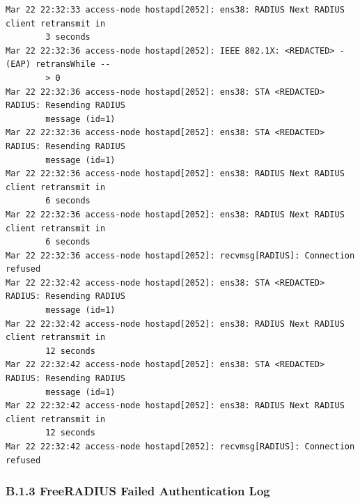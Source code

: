 \documentclass[11pt]{article}
\begin{document}
\begin{verbatim}
Mar 22 22:32:33 access-node hostapd[2052]: ens38: RADIUS Next RADIUS client retransmit in 
        3 seconds
Mar 22 22:32:36 access-node hostapd[2052]: IEEE 802.1X: <REDACTED> - (EAP) retransWhile --
        > 0
Mar 22 22:32:36 access-node hostapd[2052]: ens38: STA <REDACTED> RADIUS: Resending RADIUS 
        message (id=1)
Mar 22 22:32:36 access-node hostapd[2052]: ens38: STA <REDACTED> RADIUS: Resending RADIUS 
        message (id=1)
Mar 22 22:32:36 access-node hostapd[2052]: ens38: RADIUS Next RADIUS client retransmit in 
        6 seconds
Mar 22 22:32:36 access-node hostapd[2052]: ens38: RADIUS Next RADIUS client retransmit in 
        6 seconds
Mar 22 22:32:36 access-node hostapd[2052]: recvmsg[RADIUS]: Connection refused
Mar 22 22:32:42 access-node hostapd[2052]: ens38: STA <REDACTED> RADIUS: Resending RADIUS 
        message (id=1)
Mar 22 22:32:42 access-node hostapd[2052]: ens38: RADIUS Next RADIUS client retransmit in 
        12 seconds
Mar 22 22:32:42 access-node hostapd[2052]: ens38: STA <REDACTED> RADIUS: Resending RADIUS 
        message (id=1)
Mar 22 22:32:42 access-node hostapd[2052]: ens38: RADIUS Next RADIUS client retransmit in 
        12 seconds
Mar 22 22:32:42 access-node hostapd[2052]: recvmsg[RADIUS]: Connection refused
\end{verbatim}


\subsubsection{B.1.3 FreeRADIUS Failed Authentication Log}
\label{sec:appendix-b-freeradius-failed-auth-incident-log}
\end{document}
